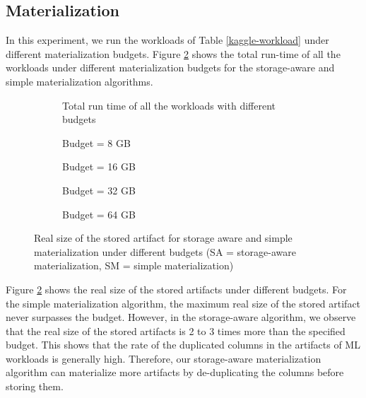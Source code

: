 \subsection{Materialization}
In this experiment, we run the workloads of Table \ref{kaggle-workload} under different materialization budgets.
Figure \ref{exp-sa-vs-simple-size} shows the total run-time of all the workloads under different materialization budgets for the storage-aware and simple materialization algorithms.
\begin{figure}
\begin{subfigure}[b]{\linewidth}
\centering
 \resizebox{0.5\columnwidth}{!}{%
%
}
\caption{Total run time of all the workloads with different budgets}
\label{exp-runtime-vs-mat-budget}
\end{subfigure}
\begin{subfigure}[b]{0.5\linewidth}
\centering
 \resizebox{\columnwidth}{!}{%
%
}
\caption{Budget = 8 GB}
\end{subfigure}%
\begin{subfigure}[b]{0.5\linewidth}
\centering
 \resizebox{\columnwidth}{!}{%
%
}

\caption{Budget = 16 GB}
\end{subfigure}
\begin{subfigure}[b]{0.5\linewidth}
\centering
 \resizebox{\columnwidth}{!}{%
%
}

\caption{Budget = 32 GB}
\end{subfigure}%
\begin{subfigure}[b]{0.5\linewidth}
\centering
 \resizebox{\columnwidth}{!}{%
%
}
\caption{Budget = 64 GB}
\end{subfigure}
\caption{Real size of the stored artifact for storage aware and simple materialization under different budgets (SA = storage-aware materialization, SM = simple materialization)  }
\label{exp-sa-vs-simple-size}
\end{figure}
Figure \ref{exp-sa-vs-simple-size} shows the real size of the stored artifacts under different budgets.
For the simple materialization algorithm, the maximum real size of the stored artifact never surpasses the budget.
However, in the storage-aware algorithm, we observe that the real size of the stored artifacts is 2 to 3 times more than the specified budget.
This shows that the rate of the duplicated columns in the artifacts of ML workloads is generally high.
Therefore, our storage-aware materialization algorithm can materialize more artifacts by de-duplicating the columns before storing them.

